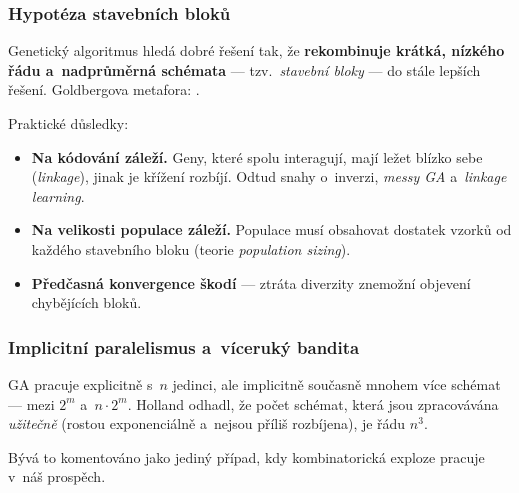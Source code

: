 \documentclass[11pt,a4paper]{article}
\theoremstyle{definition}
\begin{document}
\subsubsection{Hypotéza stavebních bloků}

\begin{defbox}
Genetický algoritmus hledá dobré řešení tak, že \textbf{rekombinuje krátká,
nízkého řádu a~nadprůměrná schémata} --- tzv.\ \emph{stavební bloky} ---
do stále lepších řešení.
Goldbergova metafora: .
\end{defbox}

Praktické důsledky:
\begin{itemize}
\item \textbf{Na kódování záleží.} Geny, které spolu interagují, mají ležet
  blízko sebe (\emph{linkage}), jinak je křížení rozbíjí. Odtud snahy o~inverzi,
  \emph{messy GA} a~\emph{linkage learning}.
\item \textbf{Na velikosti populace záleží.} Populace musí obsahovat dostatek
  vzorků od každého stavebního bloku (teorie \emph{population sizing}).
\item \textbf{Předčasná konvergence škodí} --- ztráta diverzity znemožní
  objevení chybějících bloků.
\end{itemize}

\subsubsection{Implicitní paralelismus a~víceruký bandita}

\begin{defbox}
GA pracuje explicitně s~$n$ jedinci, ale implicitně současně 
mnohem více schémat --- mezi $2^m$ a~$n \cdot 2^m$. Holland odhadl, že počet
schémat, která jsou zpracovávána \emph{užitečně} (rostou exponenciálně a~nejsou
příliš rozbíjena), je řádu $n^3$.
\end{defbox}

Bývá to komentováno jako jediný případ, kdy kombinatorická exploze pracuje
v~náš prospěch.
\end{document}
